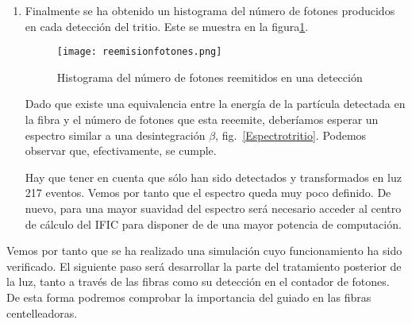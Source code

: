 \begin{enumerate}
\item{} Finalmente se ha obtenido un histograma del número de fotones producidos en cada detección del tritio. Este se muestra en la figura\ref{reemision}.

\begin{figure}[hbtp]
\centering
\texttt{[image: reemisionfotones.png]}
\caption{Histograma del número de fotones reemitidos en una detección \label{reemision}}
\end{figure}

Dado que existe una equivalencia entre la energía de la partícula detectada en la fibra y el número de fotones que esta reeemite, deberíamos esperar un espectro similar a una desintegración $\beta$, fig.~\ref{Espectrotritio}. Podemos observar que, efectivamente, se cumple.

Hay que tener en cuenta que sólo han sido detectados y transformados en luz 217 eventos. Vemos por tanto que el espectro queda muy poco definido. De nuevo, para una mayor suavidad del espectro será necesario acceder al centro de cálculo del IFIC para disponer de de una mayor potencia de computación.
\end{enumerate}

Vemos por tanto que se ha realizado una simulación cuyo funcionamiento ha sido verificado. El siguiente paso será desarrollar la parte del tratamiento posterior de la luz, tanto a través de las fibras como su detección en el contador de fotones. De esta forma podremos comprobar la importancia del guiado en las fibras centelleadoras.